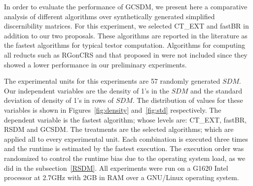 \documentclass[authoryear,11pt]{elsarticle}
\begin{document}
	In order to evaluate the performance of GCSDM, we present here a comparative analysis of different
	algorithms over synthetically generated simplified discernibility matrices. For this experiment, we
	selected CT\_EXT and fastBR in addition to our two proposals. These algorithms are reported in the 
	literature as the fastest algorithms for typical testor computation. Algorithms for computing all
	reducts such as RGonCRS \citep{WangP07} and that proposed in \citep{Starzyk00} were not included
	since they showed a lower performance in our preliminary experiments. 
	
	The experimental units for this experiments are 57 randomly generated $SDM$. Our independent 
	variables are the density of 1's in the $SDM$ and the standard deviation of density of 1's in rows
	of $SDM$. The distribution of values for these variables is shown in Figures~\ref{fig:density} 
	and~\ref{fig:std} respectively. The dependent variable is the fastest algorithm; whose levels are:
	CT\_EXT, fastBR, RSDM and GCSDM. The treatments are the selected algorithms; which are applied
	all to every experimental unit. Each combination is executed three times and the runtime is 
	estimated by the fastest execution. 
	The execution order was randomized to control the runtime bias due to the operating system load, as 
	we did in the subsection~\ref{RSDM}. All experiments were run on a G1620 Intel processor at 2.7GHz with 
	2GB in RAM over a GNU/Linux operating system.
	
\end{document}
